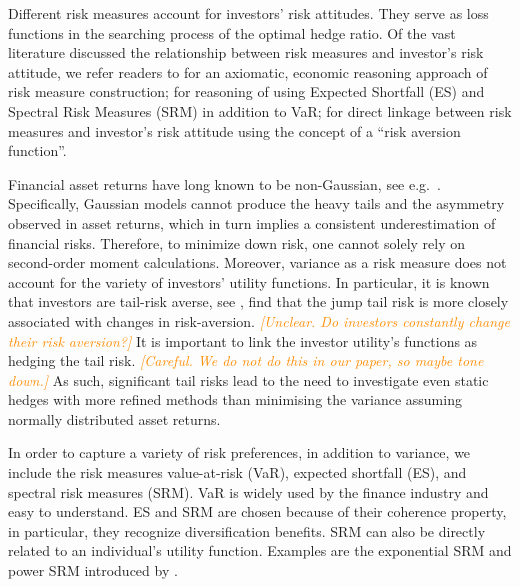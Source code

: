 \documentclass[11pt,a4paper,english]{article}
\providecommand{\natp}[1]{\textcolor{darkorange}{#1}}
\begin{document}
Different risk measures account for investors' risk attitudes.
They serve as loss functions in the searching process of the optimal
hedge ratio. Of the vast literature discussed the relationship between
risk measures and investor's risk attitude, we refer readers to
\citet{artzner1999coherent} for an axiomatic, economic reasoning
approach of risk measure construction;
\citet{embrechts2002correlation} for reasoning of using Expected
Shortfall (ES) and Spectral Risk Measures (SRM) in addition to VaR;
\citet{Acerbi2002} for direct linkage between risk measures and
investor's risk attitude using the concept of a ``risk aversion
function''.  

Financial asset returns have long known to be non-Gaussian, see e.g.\
\citep{fama1963mandelbrot,Cont2001}. Specifically, Gaussian models
cannot produce the heavy tails and the asymmetry observed in 
asset returns, which in turn implies a consistent underestimation of
financial risks. 
Therefore, to minimize down risk, one cannot solely rely on
second-order moment calculations. Moreover, variance as a risk measure
does not account for the variety of investors' utility functions. In
particular, it is known that  
investors are tail-risk averse, see \cite{menezes1980increasing},
\citet{bollerslev2015tail} find that the jump tail risk is more
closely associated with changes in risk-aversion. \natp{\em
  [Unclear. Do investors constantly change their risk aversion?]}
It is important to link the investor utility's functions as hedging
the tail risk. \natp{\em [Careful. We do not do this in our paper, so
  maybe tone down.]}
As such, significant tail risks lead to the need to investigate even
static hedges with more refined methods than minimising the variance
assuming normally distributed asset
returns\citep{ederington2008minimum}.

In order to capture a variety of risk preferences, in addition to
variance, we include the risk measures value-at-risk (VaR), expected
shortfall (ES), and spectral risk measures (SRM). 
VaR is widely used by the finance industry and easy to understand. 
ES and SRM are chosen because of their coherence property, in
particular, they recognize diversification benefits.
SRM can also be directly related to an individual's utility function.
Examples are the exponential SRM and power SRM introduced by
\citet{dowd2008spectral}.
\end{document}
